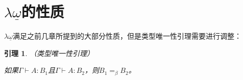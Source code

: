 \documentclass[UTF8]{article}
\newtheorem{lemma}[thm]{引理}
\begin{document}
	\section{$\lambda{\underline{\omega}}$的性质}
		\noindent
		$\lambda{\underline{\omega}}$满足之前几章所提到的大部分性质，但是类型唯一性引理需要进行调整：
		
		\begin{lemma}（类型唯一性引理）
			
			如果$\Gamma\vdash A:B_1$且$\Gamma\vdash A:B_2$，则$B_1=_\beta B_2$。
		\end{lemma}
\end{document}

